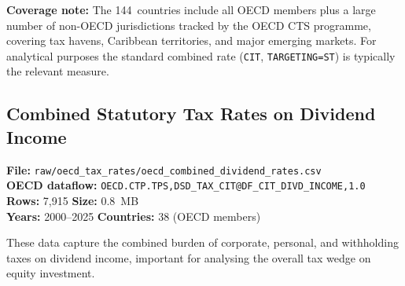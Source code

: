\documentclass[11pt,a4paper]{article}
\begin{document}
\noindent\textbf{Coverage note:} The 144~countries include all OECD members plus a large
number of non-OECD jurisdictions tracked by the OECD CTS programme, covering
tax havens, Caribbean territories, and major emerging markets.  For analytical
purposes the standard combined rate (\texttt{CIT}, \texttt{TARGETING=ST}) is
typically the relevant measure.

\subsection{Combined Statutory Tax Rates on Dividend Income}
\label{subsec:dividend_rates}

\textbf{File:} \texttt{raw/oecd\_tax\_rates/oecd\_combined\_dividend\_rates.csv}\\
\textbf{OECD dataflow:} \texttt{OECD.CTP.TPS,DSD\_TAX\_CIT@DF\_CIT\_DIVD\_INCOME,1.0}\\
\textbf{Rows:} 7{,}915 \quad \textbf{Size:} 0.8~MB\\
\textbf{Years:} 2000--2025 \quad \textbf{Countries:} 38 (OECD members)

These data capture the combined burden of corporate, personal, and withholding
taxes on dividend income, important for analysing the overall tax wedge on
equity investment.
\end{document}
